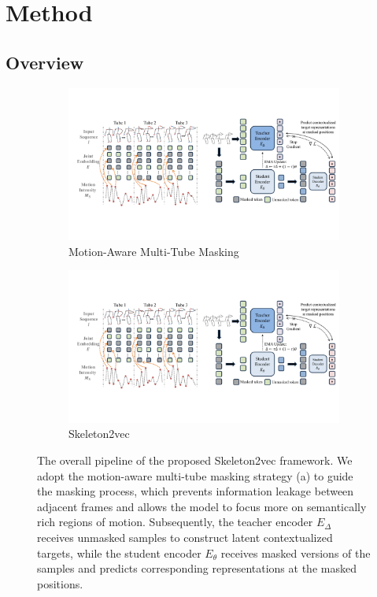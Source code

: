 \section{Method}
\subsection{Overview}

\begin{figure}[tb]
	\centering
	\begin{subfigure}{0.49\linewidth}
		\centering
		\includegraphics[width=0.95\linewidth]{figures/fig2_motion_aware_tube_masking.pdf}
		\caption{Motion-Aware Multi-Tube Masking}
		\label{fig2:motion_aware_tube_masking}
	\end{subfigure}
	\centering
	\begin{subfigure}{0.49\linewidth}
		\centering
		\includegraphics[width=0.95\linewidth]{figures/fig2_skeleton2vec.pdf}
		\caption{Skeleton2vec}
		\label{fig2:skeleton2vec}
	\end{subfigure}
    \caption{
    The overall pipeline of the proposed Skeleton2vec framework.
    We adopt the motion-aware multi-tube masking strategy (a) to guide the masking process,
    which prevents information leakage between adjacent frames and allows the model
    to focus more on semantically rich regions of motion. Subsequently, the teacher
    encoder $E_{\Delta}$ receives unmasked samples to construct latent contextualized targets,
    while the student encoder $E_{\theta}$ receives masked versions of the samples
    and predicts corresponding representations at the masked positions.
    }
    \label{fig2}
\end{figure}


